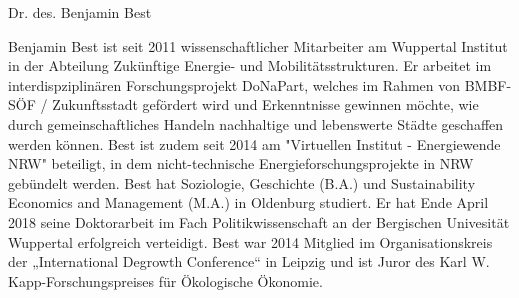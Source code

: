 
Dr. des. Benjamin Best 

Benjamin Best ist seit 2011 wissenschaftlicher Mitarbeiter am Wuppertal Institut in der Abteilung Zukünftige Energie- und Mobilitätsstrukturen. Er arbeitet im interdispziplinären Forschungsprojekt DoNaPart, welches im Rahmen von BMBF-SÖF / Zukunftsstadt gefördert wird und Erkenntnisse gewinnen möchte, wie durch gemeinschaftliches Handeln nachhaltige und lebenswerte Städte geschaffen werden können. Best ist zudem seit 2014 am "Virtuellen Institut - Energiewende NRW" beteiligt, in dem nicht-technische Energieforschungsprojekte in NRW gebündelt werden. 
Best hat Soziologie, Geschichte (B.A.) und Sustainability Economics and Management (M.A.) in Oldenburg studiert. Er hat Ende April 2018 seine Doktorarbeit im Fach Politikwissenschaft an der Bergischen Univesität Wuppertal erfolgreich verteidigt. Best war 2014 Mitglied im Organisationskreis der „International Degrowth Conference“ in Leipzig und ist Juror des Karl W. Kapp-Forschungspreises für Ökologische Ökonomie. 
\fi